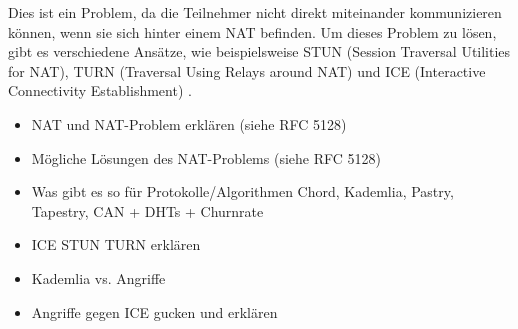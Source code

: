 Dies ist ein Problem, da die Teilnehmer nicht direkt miteinander kommunizieren können, wenn sie sich hinter einem NAT befinden. Um dieses Problem zu lösen, gibt es verschiedene Ansätze, wie beispielsweise STUN (Session Traversal Utilities for NAT), TURN (Traversal Using Relays around NAT) und ICE (Interactive Connectivity Establishment) \parencite[S. 1]{rfc8489_STUN}.


\begin{itemize}
    \item NAT und NAT-Problem erklären (siehe RFC 5128)
    \item Mögliche Lösungen des NAT-Problems (siehe RFC 5128)
    \item Was gibt es so für Protokolle/Algorithmen Chord, Kademlia, Pastry, Tapestry, CAN + DHTs + Churnrate
    \item ICE STUN TURN erklären
    \item Kademlia vs. Angriffe
    \item Angriffe gegen ICE gucken und erklären
\end{itemize}